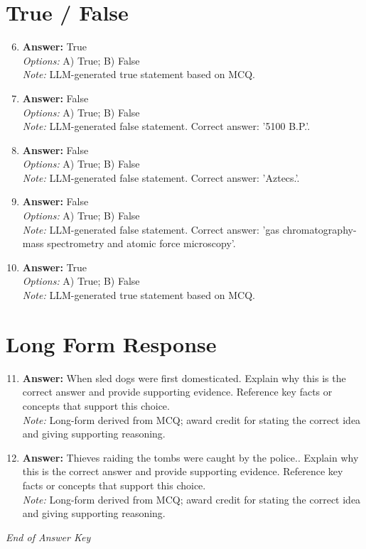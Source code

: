 \documentclass[12pt]{article}
\begin{document}
\section*{True / False}
\begin{enumerate}[label=\arabic*.]
\setcounter{enumi}{5}
\item \textbf{Answer:} True
\\ \textit{Options:} A) True; B) False
\\ \textit{Note:} LLM-generated true statement based on MCQ.
\item \textbf{Answer:} False
\\ \textit{Options:} A) True; B) False
\\ \textit{Note:} LLM-generated false statement. Correct answer: '5100 B.P.'.
\item \textbf{Answer:} False
\\ \textit{Options:} A) True; B) False
\\ \textit{Note:} LLM-generated false statement. Correct answer: 'Aztecs.'.
\item \textbf{Answer:} False
\\ \textit{Options:} A) True; B) False
\\ \textit{Note:} LLM-generated false statement. Correct answer: 'gas chromatography-mass spectrometry and atomic force microscopy'.
\item \textbf{Answer:} True
\\ \textit{Options:} A) True; B) False
\\ \textit{Note:} LLM-generated true statement based on MCQ.
\end{enumerate}

\section*{Long Form Response}
\begin{enumerate}[label=\arabic*.]
\setcounter{enumi}{10}
\item \textbf{Answer:} When sled dogs were first domesticated. Explain why this is the correct answer and provide
supporting evidence. Reference key facts or concepts that support this choice.
\\ \textit{Note:} Long-form derived from MCQ; award credit for stating the correct idea and giving supporting reasoning.
\item \textbf{Answer:} Thieves raiding the tombs were caught by the police.. Explain why this is the correct
answer and provide supporting evidence. Reference key facts or concepts that support this
choice.
\\ \textit{Note:} Long-form derived from MCQ; award credit for stating the correct idea and giving supporting reasoning.
\end{enumerate}

\vfill
\noindent\textit{End of Answer Key}
\end{document}
